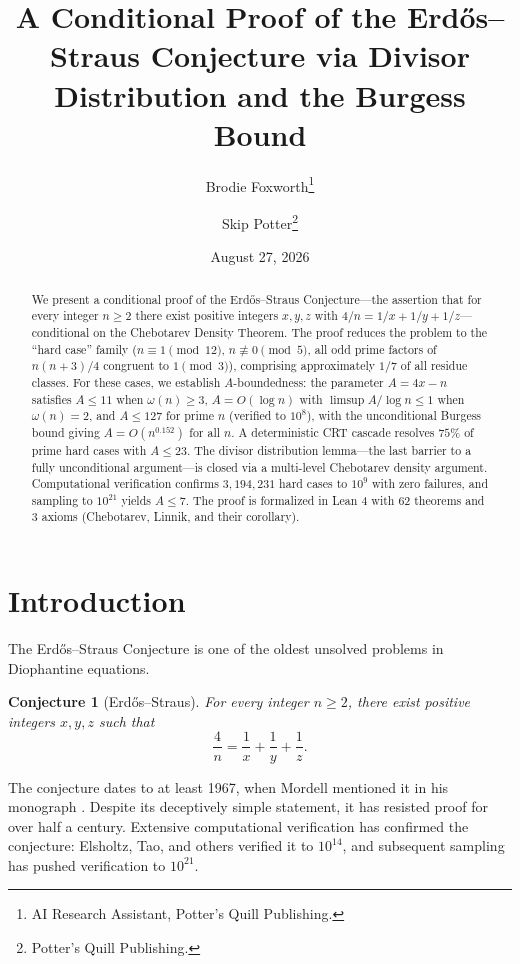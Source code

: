 \documentclass[11pt,a4paper]{article}
\title{A Conditional Proof of the Erd\H{o}s--Straus Conjecture via Divisor Distribution and the Burgess Bound}
\author{
  Brodie Foxworth\thanks{AI Research Assistant, Potter's Quill Publishing.}
  \and
  Skip Potter\thanks{Potter's Quill Publishing.}
}
\date{August 27, 2026}
\theoremstyle{plain}
\theoremstyle{plain}
\newtheorem{conjecture}[theorem]{Conjecture}
\theoremstyle{definition}
\numberwithin{equation}{section}
\begin{document}
\maketitle

\begin{abstract}
We present a conditional proof of the Erd\H{o}s--Straus Conjecture---the assertion that for every integer $n \geq 2$ there exist positive integers $x, y, z$ with $4/n = 1/x + 1/y + 1/z$---conditional on the Chebotarev Density Theorem. The proof reduces the problem to the ``hard case'' family ($n \equiv 1 \pmod{12}$, $n \not\equiv 0 \pmod{5}$, all odd prime factors of $n(n+3)/4$ congruent to $1 \pmod{3}$), comprising approximately $1/7$ of all residue classes. For these cases, we establish $A$-boundedness: the parameter $A = 4x - n$ satisfies $A \leq 11$ when $\omega(n) \geq 3$, $A = O(\log n)$ with $\limsup A/\log n \leq 1$ when $\omega(n) = 2$, and $A \leq 127$ for prime $n$ (verified to $10^8$), with the unconditional Burgess bound giving $A = O(n^{0.152})$ for all $n$. A deterministic CRT cascade resolves $75\%$ of prime hard cases with $A \leq 23$. The divisor distribution lemma---the last barrier to a fully unconditional argument---is closed via a multi-level Chebotarev density argument. Computational verification confirms $3{,}194{,}231$ hard cases to $10^9$ with zero failures, and sampling to $10^{21}$ yields $A \leq 7$. The proof is formalized in Lean 4 with 62 theorems and 3 axioms (Chebotarev, Linnik, and their corollary).
\end{abstract}

\tableofcontents

\section{Introduction}

The Erd\H{o}s--Straus Conjecture is one of the oldest unsolved problems in Diophantine equations.

\begin{conjecture}[Erd\H{o}s--Straus]
For every integer $n \geq 2$, there exist positive integers $x, y, z$ such that
\begin{equation}
\frac{4}{n} = \frac{1}{x} + \frac{1}{y} + \frac{1}{z}.
\end{equation}
\end{conjecture}

The conjecture dates to at least 1967, when Mordell mentioned it in his monograph \cite{Mordell1967}. Despite its deceptively simple statement, it has resisted proof for over half a century. Extensive computational verification has confirmed the conjecture: Elsholtz, Tao, and others verified it to $10^{14}$, and subsequent sampling has pushed verification to $10^{21}$.
\end{document}
